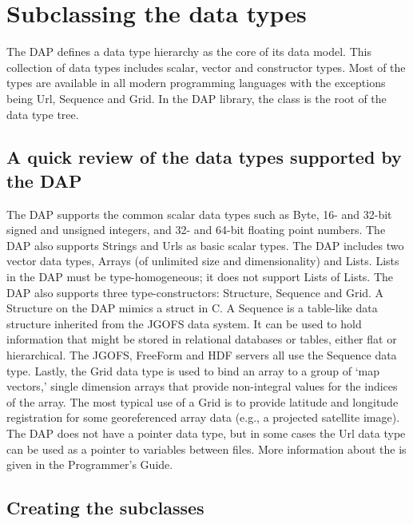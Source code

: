 \documentclass{dods-paper}
\begin{document}
  

\section{Subclassing the data types}

  

The DAP defines a data type hierarchy as the core of its data model.
This collection of data types includes scalar, vector and
constructor types. Most of the types are available in all modern
programming languages with the exceptions being Url, Sequence and
Grid. In the DAP library, the class  is the root of the
data type tree. 



\subsection{A quick review of the data types supported by the DAP}

The DAP supports the common scalar data types such as Byte, 16- and 32-bit
signed and unsigned integers, and 32- and 64-bit floating point numbers. The
DAP also supports Strings and Urls as basic scalar types. The DAP includes
two vector data types, Arrays (of unlimited size and dimensionality) and
Lists. Lists in the DAP must be type-homogeneous; it does not support Lists
of Lists. The DAP also supports three type-constructors: Structure, Sequence
and Grid. A Structure on the DAP mimics a struct in C. A Sequence is a
table-like data structure inherited from the JGOFS data system. It can be
used to hold information that might be stored in relational databases or
tables, either flat or hierarchical. The JGOFS, FreeForm and HDF servers all
use the Sequence data type. Lastly, the Grid data type is used to bind an
array to a group of `map vectors,' single dimension arrays that provide
non-integral values for the indices of the array.  The most typical use of a
Grid is to provide latitude and longitude registration for some georeferenced
array data (e.g., a projected satellite image). The DAP does not have a
pointer data type, but in some cases the Url data type can be used as a
pointer to variables between files.  More information about the 
is given in the Programmer's Guide.


\subsection{Creating the subclasses}
\end{document}
